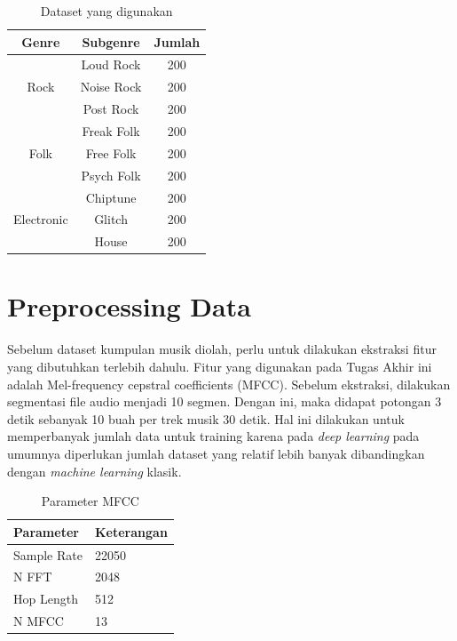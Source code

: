 \begin{table}[h]
	\centering
	
	\caption{Dataset yang digunakan}
	
	\begin{tabular}{|c|c|c|}
		\hline
		\textbf{Genre}              & \textbf{Subgenre} & \textbf{Jumlah} \\ \hline
		\multirow{3}{*}{Rock}       & Loud Rock         & 200             \\ \cline{2-3} 
		& Noise Rock        & 200             \\ \cline{2-3} 
		& Post Rock         & 200             \\ \hline
		\multirow{3}{*}{Folk}       & Freak Folk        & 200             \\ \cline{2-3} 
		& Free Folk         & 200             \\ \cline{2-3} 
		& Psych Folk        & 200             \\ \hline
		\multirow{3}{*}{Electronic} & Chiptune          & 200             \\ \cline{2-3} 
		& Glitch            & 200             \\ \cline{2-3} 
		& House             & 200             \\ \hline
	\end{tabular}
	
	\label{fig:dataset}
\end{table}

\section{Preprocessing Data}
\label{sec:preprocessing}

Sebelum dataset kumpulan musik diolah, perlu untuk dilakukan ekstraksi fitur yang dibutuhkan terlebih dahulu. Fitur yang digunakan pada Tugas Akhir ini adalah Mel-frequency cepstral coefficients (MFCC). Sebelum ekstraksi, dilakukan segmentasi file audio menjadi 10 segmen. Dengan ini, maka didapat potongan 3 detik sebanyak 10 buah per trek musik 30 detik. Hal ini dilakukan untuk memperbanyak jumlah data untuk training karena pada \emph{deep learning} pada umumnya diperlukan jumlah dataset yang relatif lebih banyak dibandingkan dengan \emph{machine learning} klasik. 

\begin{table}[H]
	
	\centering
	
	\caption{Parameter MFCC}
	
	\begin{tabular}{|l|l|}
		\hline
		\textbf{Parameter} & \textbf{Keterangan} \\ \hline
		Sample Rate        & 22050               \\ \hline
		N FFT              & 2048                \\ \hline
		Hop Length         & 512                 \\ \hline
		N MFCC             & 13                  \\ \hline
	\end{tabular}

	\label{fig:mfccparameter}
\end{table}

